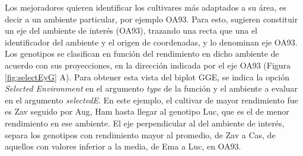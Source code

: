 
Los mejoradores quieren identificar los cultivares más adaptados a su área, es decir a un ambiente particular, por ejemplo OA93. Para esto, \citet{YanHunt2002} sugieren constituir un eje del ambiente de interés (OA93), trazando una recta que una el identificador del ambiente y el origen de coordenadas, y lo denominan eje OA93. Los genotipos se  clasifican en función del rendimiento en dicho ambiente de acuerdo con sus proyecciones, en la dirección indicada por el eje OA93 (Figura \ref{fig:selectEyG} A). Para obtener esta vista del biplot GGE, se indica la opción \emph{Selected Environment} en el argumento \emph{type} de la función y el ambiente a evaluar en el argumento  \emph{selectedE}. En este ejemplo, el cultivar de mayor rendimiento fue es Zav seguido por Aug, Ham hasta llegar al genotipo Luc, que es el de menor rendimiento en ese ambiente. El eje perpendicular al del ambiente de interés, separa los genotipos con rendimiento mayor al promedio, de Zav a Cas, de aquellos con valores inferior a la media, de Ema a Luc, en OA93.
 
